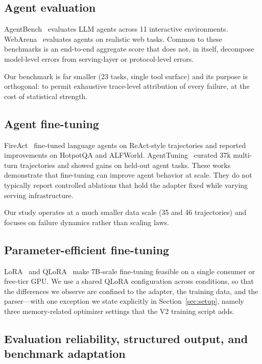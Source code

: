 \documentclass[10pt,twocolumn]{article}
\begin{document}
\subsection{Agent evaluation}

AgentBench~\citep{liu2023agentbench} evaluates LLM agents across 11 interactive environments. WebArena~\citep{zhou2023webarena} evaluates agents on realistic web tasks. Common to these benchmarks is an end-to-end aggregate score that does not, in itself, decompose model-level errors from serving-layer or protocol-level errors.

Our benchmark is far smaller (23 tasks, single tool surface) and its purpose is orthogonal: to permit exhaustive trace-level attribution of every failure, at the cost of statistical strength.

\subsection{Agent fine-tuning}

FireAct~\citep{chen2023fireact} fine-tuned language agents on ReAct-style trajectories and reported improvements on HotpotQA and ALFWorld. AgentTuning~\citep{zeng2023agenttuning} curated 37k multi-turn trajectories and showed gains on held-out agent tasks. These works demonstrate that fine-tuning can improve agent behavior at scale. They do not typically report controlled ablations that hold the adapter fixed while varying serving infrastructure.

Our study operates at a much smaller data scale (35 and 46 trajectories) and focuses on failure dynamics rather than scaling laws.

\subsection{Parameter-efficient fine-tuning}

LoRA~\citep{hu2021lora} and QLoRA~\citep{dettmers2023qlora} make 7B-scale fine-tuning feasible on a single consumer or free-tier GPU. We use a shared QLoRA configuration across conditions, so that the differences we observe are confined to the adapter, the training data, and the parser---with one exception we state explicitly in Section~\ref{sec:setup}, namely three memory-related optimizer settings that the V2 training script adds.

\subsection{Evaluation reliability, structured output, and benchmark adaptation}
\end{document}
